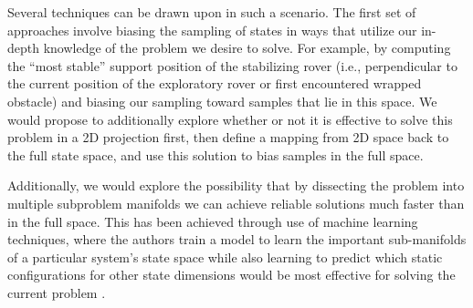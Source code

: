 \documentclass[12pt]{article}
\begin{document}
Several techniques can be drawn upon in such a scenario. The first set of approaches involve biasing the sampling of states 
in ways that utilize our in-depth knowledge of the problem we desire to solve. For example, by computing the ``most stable'' support 
position of the stabilizing rover (i.e., perpendicular to the current position of the exploratory rover or first encountered wrapped obstacle) 
and biasing our sampling toward samples that lie in this space. We would propose to additionally explore whether or not 
it is effective to solve this problem in a 2D projection first, then define a mapping from 2D space back to the full state space, 
and use this solution to bias samples in the full space. 

Additionally, we would explore the possibility that by dissecting the problem into multiple subproblem manifolds we can achieve reliable 
solutions much faster than in the full space. This has been achieved through use of machine learning techniques, where the authors 
train a model to learn the important sub-manifolds of a particular system's state space while also learning to predict which static 
configurations for other state dimensions would be most effective for solving the current problem \cite{learning_biases}. 









\newpage

\small{}

\end{document}
